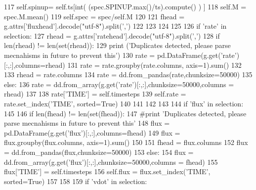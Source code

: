 \begin{DoxyCode}
117                 self.spinup= self.ts[int( (spec.SPINUP.max()/ts).compute() ) ]
118                 self.M =  spec.M.mean()
119                 self.spec = spec/self.M
120 
121                 fhead = g.attrs[\textcolor{stringliteral}{'fluxhead'}].decode(\textcolor{stringliteral}{"utf-8"}).split(\textcolor{stringliteral}{','})
122 
123 
124 
125 
126             \textcolor{keywordflow}{if} \textcolor{stringliteral}{'rate'} \textcolor{keywordflow}{in} selection:
127                 rhead = g.attrs[\textcolor{stringliteral}{'ratehead'}].decode(\textcolor{stringliteral}{"utf-8"}).split(\textcolor{stringliteral}{','})
128                 \textcolor{keywordflow}{if} len(rhead) != len(set(rhead)):
129                     \textcolor{keywordflow}{print} (\textcolor{stringliteral}{'Duplicates detected, please parse mecnahisms in future to prevent this'})
130                     rate = pd.DataFrame(g.get(\textcolor{stringliteral}{'rate'})[:,:],columns=rhead)
131                     rate = rate.groupby(rate.columns, axis=1).sum()
132 
133                     rhead = rate.columns
134                     rate = dd.from\_pandas(rate,chunksize=50000)
135                 \textcolor{keywordflow}{else}:
136                     rate = dd.from\_array(g.get(\textcolor{stringliteral}{'rate'})[:,:],chunksize=50000,columns = rhead)
137 
138                 rate[\textcolor{stringliteral}{'TIME'}] = self.timesteps
139                 self.rate = rate.set\_index(\textcolor{stringliteral}{'TIME'}, sorted=\textcolor{keyword}{True})
140 
141 
142 
143 
144             \textcolor{keywordflow}{if} \textcolor{stringliteral}{'flux'} \textcolor{keywordflow}{in} selection:
145 
146                 \textcolor{keywordflow}{if} len(fhead) != len(set(fhead)):
147                     \textcolor{comment}{#print 'Duplicates detected, please parse mecnahisms in future to prevent this'}
148                     flux = pd.DataFrame(g.get(\textcolor{stringliteral}{'flux'})[:,:],columns=fhead)
149                     flux = flux.groupby(flux.columns, axis=1).sum()
150 
151                     fhead = flux.columns
152                     flux = dd.from\_pandas(flux,chunksize=50000)
153                 \textcolor{keywordflow}{else}:
154                     flux = dd.from\_array(g.get(\textcolor{stringliteral}{'flux'})[:,:],chunksize=50000,columns = fhead)
155                 flux[\textcolor{stringliteral}{'TIME'}] = self.timesteps
156                 self.flux = flux.set\_index(\textcolor{stringliteral}{'TIME'}, sorted=\textcolor{keyword}{True})
157 
158 
159             \textcolor{keywordflow}{if} \textcolor{stringliteral}{'vdot'} \textcolor{keywordflow}{in} selection:

\end{DoxyCode}
